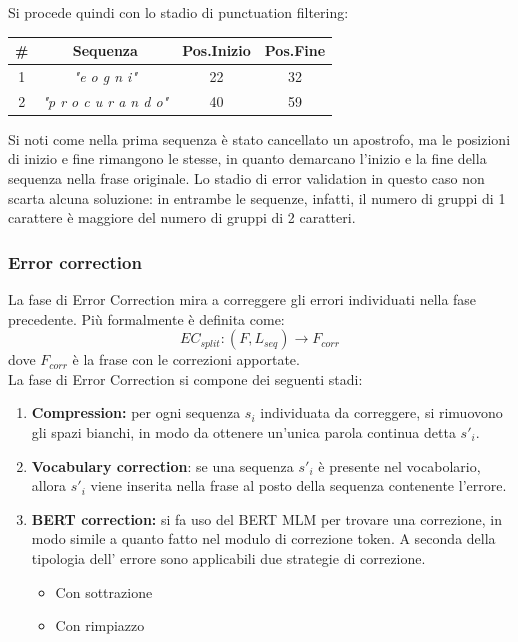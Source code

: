 Si procede quindi con lo stadio di punctuation filtering:
\begin{table}[H]
\centering
\begin{tabular}{cccc}
\#&\textbf{Sequenza} & \textbf{Pos.Inizio} & \textbf{Pos.Fine}\\ \hline
1&\textit{"e o g n i"}&22& 32\\
2&\textit{"p r o c u r a n d o"}& 40& 59\\
\end{tabular}
\end{table}
Si noti come nella prima sequenza è stato cancellato un apostrofo, ma le posizioni di inizio e fine rimangono le stesse, in quanto demarcano l'inizio e la fine della sequenza nella frase originale. Lo stadio di error validation in questo caso non scarta alcuna soluzione: in entrambe le sequenze, infatti, il numero di gruppi di 1 carattere è maggiore del numero di gruppi di 2 caratteri.

\subsubsection{Error correction}
\label{sec:met_split_errcor}
La fase di Error Correction mira a correggere gli errori individuati nella fase precedente. Più formalmente è definita come:
\begin{equation}
EC_{split}: (F,L_{seq}) \rightarrow F_{corr}
\end{equation}
dove $F_{corr}$ è la frase con le correzioni apportate.\\
La fase di Error Correction si compone dei seguenti stadi:
\begin{enumerate}
\item \textbf{Compression:} per ogni sequenza $s_i$ individuata da correggere, si rimuovono gli spazi bianchi, in modo da ottenere un'unica parola continua detta $s\prime_i$.
\item \textbf{Vocabulary correction}: se una sequenza $s\prime_i$ è presente nel vocabolario, allora $s\prime_i$ viene inserita nella frase al posto della sequenza contenente l'errore.
\item \textbf{BERT correction:} si fa uso del BERT MLM per trovare una correzione, in modo simile a quanto fatto nel modulo di correzione token. A seconda della tipologia dell' errore sono applicabili due strategie di correzione.
		\begin{itemize}
		\item Con sottrazione		
		\item Con rimpiazzo		
		\end{itemize}
\end{enumerate}

